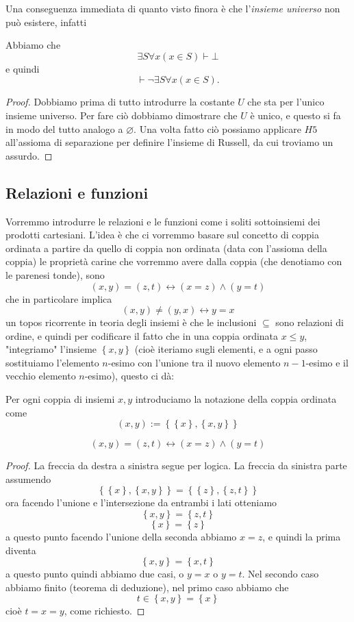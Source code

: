 \documentclass[11pt]{scrartcl}
\newcommand{\eset}{\varnothing}
\begin{document}
	Una conseguenza immediata di quanto visto finora è che l'\textit{insieme universo} non può esistere, infatti
	\begin{lemma}
		Abbiamo che
		$$\exists S\forall x\left(x\in S\right)\vdash \bot$$
		e quindi 
		$$\vdash \lnot \exists S \forall x\left(x\in S\right).$$
	\end{lemma}
	\begin{proof}
		Dobbiamo prima di tutto introdurre la costante $U$ che sta per l'unico insieme universo. Per fare ciò dobbiamo dimostrare che $U$ è unico, e questo si fa in modo del tutto analogo a $\eset$. Una volta fatto ciò possiamo applicare $H5$ all'assioma di separazione per definire l'insieme di Russell, da cui troviamo un assurdo.
	\end{proof}
	\subsection{Relazioni e funzioni}
	Vorremmo introdurre le relazioni e le funzioni come i soliti sottoinsiemi dei prodotti cartesiani. L'idea è che ci vorremmo basare sul concetto di coppia ordinata a partire da quello di coppia non ordinata (data con l'assioma della coppia) le proprietà carine che vorremmo avere dalla coppia (che denotiamo con le parenesi tonde), sono
	$$\left(x,y\right)=\left(z,t\right) \leftrightarrow \left(x=z\right)\land\left(y=t\right)$$
	che in particolare implica
	$$\left(x,y\right)\ne \left(y,x\right)\leftrightarrow y=x$$
	un topos ricorrente in teoria degli insiemi è che le inclusioni $\subseteq$ sono relazioni di ordine, e quindi per codificare il fatto che in una coppia ordinata $x\le y$, "integriamo" l'insieme $\left\{x,y\right\}$ (cioè iteriamo sugli elementi, e a ogni passo sostituiamo l'elemento $n$-esimo con l'unione tra il nuovo elemento $n-1$-esimo e il vecchio elemento $n$-esimo), questo ci dà:
	\begin{definition}
		Per ogni coppia di insiemi $x,y$ introduciamo la notazione della coppia ordinata come
		$$\left(x,y\right):=\left\{\left\{x\right\},\left\{x,y\right\}\right\}$$
	\end{definition}
	\begin{proposition}
		$$\left(x,y\right)=\left(z,t\right)\leftrightarrow \left(x=z\right)\land \left(y=t\right)$$
	\end{proposition}
	\begin{proof}
		La freccia da destra a sinistra segue per logica. La freccia da sinistra parte assumendo
		$$\left\{\left\{x\right\},\left\{x,y\right\}\right\}=\left\{\left\{z\right\},\left\{z,t\right\}\right\}$$
		ora facendo l'unione e l'intersezione da entrambi i lati otteniamo
		$$\left\{x,y\right\}=\left\{z,t\right\}$$
		$$\left\{x\right\}=\left\{z\right\}$$
		a questo punto facendo l'unione della seconda abbiamo $x=z$, e quindi la prima diventa
		$$\left\{x,y\right\}=\left\{x,t \right\}$$
		a questo punto quindi abbiamo due casi, o $y=x$ o $y=t$. Nel secondo caso abbiamo finito (teorema di deduzione), nel primo caso abbiamo che 
		$$t\in \left\{x,y\right\}=\left\{x\right\}$$
		cioè $t=x=y$, come richiesto.
	\end{proof}
\end{document}
